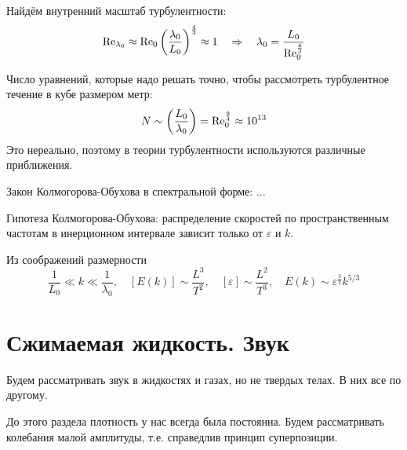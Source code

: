 Найдём внутренний масштаб турбулентности:
\begin{equation}
    \Re_{\lambda_0} \approx \Re_0 
        \qty(\frac{\lambda_0}{L_0})^\frac{4}{3}    \approx 1 
        \quad\Rightarrow\quad 
        \lambda_0 = \frac{L_0}{\Re_0^\frac{4}{3}}
\end{equation}

Число уравнений, которые надо решать точно, чтобы 
рассмотреть турбулентное течение в кубе размером метр:
\begin{equation}
    N \sim \qty(\frac{L_0}{\lambda_0})= \Re_0^{\frac{9}{4}} \approx 10^{13} 
\end{equation}
Это нереально, поэтому в теории турбулентности используются различные
приближения.

Закон Колмогорова-Обухова в спектральной форме:
...

Гипотеза Колмогорова-Обухова: распределение скоростей по пространственным
частотам в инерционном интервале зависит только от $\varepsilon$ и $k$.

Из соображений размерности
\begin{equation}
    \frac{1}{L_0} \ll k \ll \frac{1}{\lambda_0}, \quad
    [E(k)] \sim \frac{L^3}{T^2}, \quad [\varepsilon]\sim \frac{L^2}{T^3},
    \quad  E(k) \sim \varepsilon^\frac{3}{2} k^{5/3}
\end{equation}

\section{Сжимаемая жидкость. Звук}

%
Будем рассматривать звук в жидкостях и газах, но не твердых телах.
В них все по другому. 

До этого раздела плотность у нас всегда была постоянна. Будем 
рассматривать колебания малой амплитуды, т.е. справедлив принцип
суперпозиции.

